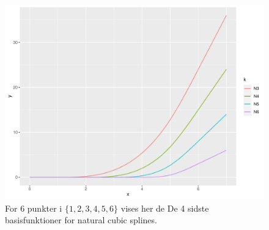\documentclass[a4paper, 12pt]{memoir}
\begin{document}
\begin{figure}
\centering
\includegraphics[width=\textwidth]{natural_cubic_splines.pdf}
\caption{For 6 punkter i $\{1,2,3,4,5,6\}$ vises her de De 4 sidste basisfunktioner for natural cubic splines.}\label{natural_cubic_spline}
\end{figure}
\end{document}
